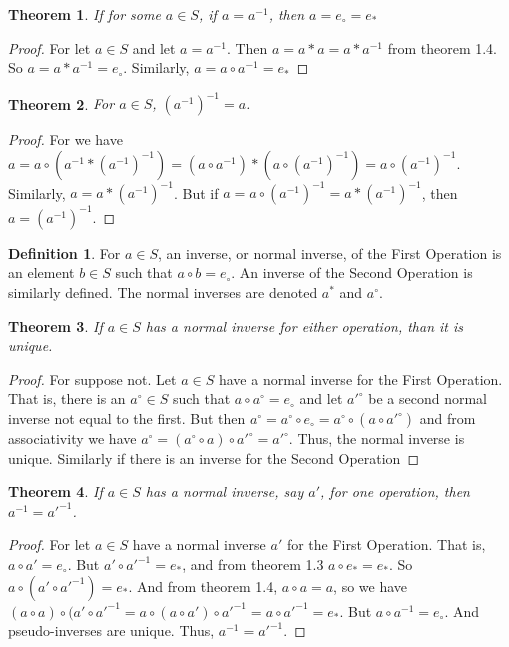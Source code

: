 \documentclass[oneside]{book}
\newtheorem{theorem}{Theorem}[section]
\theoremstyle{definition}
\newtheorem{definition}{Definition}[section]
\begin{document}
\begin{theorem} If for some $a\in S$, if $a=a^{-1}$, then $a=e_{\circ}=e_{*}$
\end{theorem}
\begin{proof} For let $a\in S$ and let $a=a^{-1}$. Then $a=a*a=a*a^{-1}$ from theorem 1.4. So $a=a*a^{-1}=e_{\circ}$. Similarly, $a=a\circ a^{-1} = e_{*}$
\end{proof}
\begin{theorem} For $a\in S$, $(a^{-1})^{-1} =a$.
\end{theorem}
\begin{proof} For we have $a = a\circ (a^{-1}* (a^{-1})^{-1}) = (a\circ a^{-1})*(a\circ (a^{-1})^{-1}) =a \circ (a^{-1})^{-1}$. Similarly, $a = a* (a^{-1})^{-1}$. But if $a = a\circ (a^{-1})^{-1} = a*(a^{-1})^{-1}$, then $a = (a^{-1})^{-1}$.
\end{proof}
\begin{definition} For $a\in S$, an inverse, or normal inverse, of the First Operation is an element $b\in S$ such that $a\circ b=e_{\circ}$. An inverse of the Second Operation is similarly defined. The normal inverses are denoted $a^{*}$ and $a^{\circ}$.
\end{definition}
\begin{theorem} If $a\in S$ has a normal inverse for either operation, than it is unique.
\end{theorem}
\begin{proof} For suppose not. Let $a\in S$ have a normal inverse for the First Operation. That is, there is an $a^{\circ}\in S$ such that $a\circ a^{\circ}=e_{\circ}$ and let $a'^{\circ}$ be a second normal inverse not equal to the first. But then $a^{\circ}=a^{\circ}\circ e_{\circ}=a^{\circ}\circ (a\circ a'^{\circ})$ and from associativity we have $a^{\circ}=(a^{\circ}\circ a)\circ a'^{\circ}=a'^{\circ}$. Thus, the normal inverse is unique. Similarly if there is an inverse for the Second Operation
\end{proof}
\begin{theorem} If $a\in S$ has a normal inverse, say $a'$, for one operation, then $a^{-1}=a'^{-1}$.
\end{theorem}
\begin{proof} For let $a\in S$ have a normal inverse $a'$ for the First Operation. That is, $a\circ a' = e_{\circ}$. But $a' \circ a'^{-1}=e_{*}$, and from theorem 1.3 $a\circ e_{*}=e_{*}$. So $a\circ (a' \circ a'^{-1})=e_{*}$. And from theorem 1.4, $a\circ a=a$, so we have $(a\circ a)\circ (a'\circ a'^{-1}=a\circ (a\circ a')\circ a'^{-1}=a\circ a'^{-1}=e_{*}$. But $a\circ a^{-1}=e_{\circ}$. And pseudo-inverses are unique. Thus, $a^{-1}=a'^{-1}$. 
\end{proof}
\end{document}
